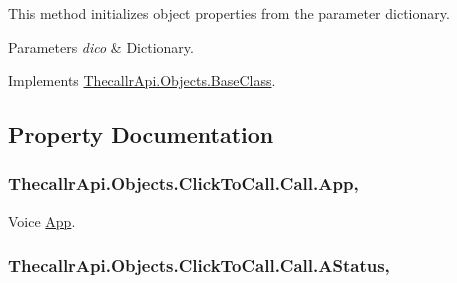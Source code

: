 This method initializes object properties from the parameter dictionary. 


\begin{DoxyParams}{Parameters}
{\em dico} & Dictionary.\\
\hline
\end{DoxyParams}


Implements \hyperlink{class_thecallr_api_1_1_objects_1_1_base_class_a77680f2cb89665fe65039581c7d907d2}{Thecallr\+Api.\+Objects.\+Base\+Class}.



\subsection{Property Documentation}
\hypertarget{class_thecallr_api_1_1_objects_1_1_click_to_call_1_1_call_a9d0ad80b98dab88fb386637ff668480e}{
\subsubsection[{App}]{ Thecallr\+Api.\+Objects.\+Click\+To\+Call.\+Call.\+App\hspace{0.3cm}{\ttfamily [get]}, {\ttfamily [set]}}}\label{class_thecallr_api_1_1_objects_1_1_click_to_call_1_1_call_a9d0ad80b98dab88fb386637ff668480e}


Voice \hyperlink{namespace_thecallr_api_1_1_objects_1_1_app}{App}. 

\hypertarget{class_thecallr_api_1_1_objects_1_1_click_to_call_1_1_call_ace27f663f3517ef92de5931bbd1bda82}{
\subsubsection[{A\+Status}]{ Thecallr\+Api.\+Objects.\+Click\+To\+Call.\+Call.\+A\+Status\hspace{0.3cm}{\ttfamily [get]}, {\ttfamily [set]}}}\label{class_thecallr_api_1_1_objects_1_1_click_to_call_1_1_call_ace27f663f3517ef92de5931bbd1bda82}


